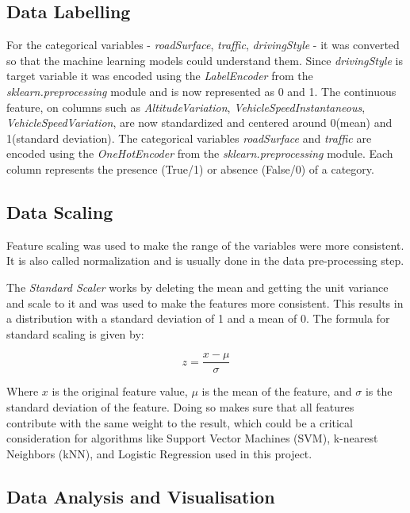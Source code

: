 \documentclass[10pt,journal,compsoc]{IEEEtran}
\begin{document}
\subsection{Data Labelling}

For the categorical variables - \textit{roadSurface}, \textit{traffic}, \textit{drivingStyle} - it was converted so that the machine learning models could understand them.
Since \textit{drivingStyle} is target variable it was encoded using the \textit{LabelEncoder} from the \textit{sklearn.preprocessing} module and is now represented as 0 and 1. The continuous feature, on columns such as \textit{AltitudeVariation}, 
\textit{VehicleSpeedInstantaneous}, \textit{VehicleSpeedVariation}, are now standardized and centered around 0(mean) and 1(standard deviation). 
The categorical variables \textit{roadSurface} and \textit{traffic} are encoded using the \textit{OneHotEncoder} from the \textit{sklearn.preprocessing} module. Each column represents
the presence (True/1) or absence (False/0) of a category.

\subsection{Data Scaling}
Feature scaling was used to make the range of the variables were more consistent. It is also called normalization and is usually done in the data pre-processing step.

The \textit{Standard Scaler} works by deleting the mean and getting the unit variance and scale to it and was used to make the features more consistent.
This results in a distribution with a standard deviation of 1 and a mean of 0.\cite{app12105256} The formula for standard scaling is given by:

\begin{equation}
    z = \frac{x - \mu}{\sigma}
\end{equation}

Where $x$ is the original feature value, $\mu$ is the mean of the feature, and $\sigma$ is the standard deviation of the feature. Doing so makes sure that all features 
contribute with the same weight to the result, which could be a critical consideration for algorithms like Support Vector Machines (SVM), 
k-nearest Neighbors (kNN), and Logistic Regression used in this project. \cite{app12105256}


\subsection{Data Analysis and Visualisation}
\end{document}
